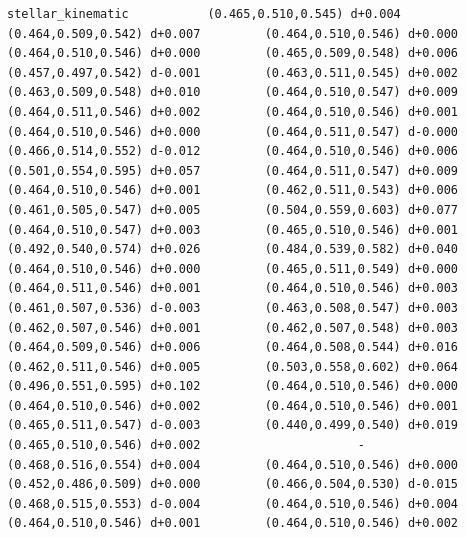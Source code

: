 \documentclass[11pt, letterpaper, openany]{book}
\begin{document}
\begin{empiricalbox}
\begin{lstlisting}[style=terminal]
stellar_kinematic           (0.465,0.510,0.545) d+0.004         (0.464,0.509,0.542) d+0.007         (0.464,0.510,0.546) d+0.000         (0.464,0.510,0.546) d+0.000         (0.465,0.509,0.548) d+0.006         (0.457,0.497,0.542) d-0.001         (0.463,0.511,0.545) d+0.002         (0.463,0.509,0.548) d+0.010         (0.464,0.510,0.547) d+0.009         (0.464,0.511,0.546) d+0.002         (0.464,0.510,0.546) d+0.001         (0.464,0.510,0.546) d+0.000         (0.464,0.511,0.547) d-0.000         (0.466,0.514,0.552) d-0.012         (0.464,0.510,0.546) d+0.006         (0.501,0.554,0.595) d+0.057         (0.464,0.511,0.547) d+0.009         (0.464,0.510,0.546) d+0.001         (0.462,0.511,0.543) d+0.006         (0.461,0.505,0.547) d+0.005         (0.504,0.559,0.603) d+0.077         (0.464,0.510,0.547) d+0.003         (0.465,0.510,0.546) d+0.001         (0.492,0.540,0.574) d+0.026         (0.484,0.539,0.582) d+0.040         (0.464,0.510,0.546) d+0.000         (0.465,0.511,0.549) d+0.000         (0.464,0.511,0.546) d+0.001         (0.464,0.510,0.546) d+0.003         (0.461,0.507,0.536) d-0.003         (0.463,0.508,0.547) d+0.003         (0.462,0.507,0.546) d+0.001         (0.462,0.507,0.548) d+0.003         (0.464,0.509,0.546) d+0.006         (0.464,0.508,0.544) d+0.016         (0.462,0.511,0.546) d+0.005         (0.503,0.558,0.602) d+0.064         (0.496,0.551,0.595) d+0.102         (0.464,0.510,0.546) d+0.000         (0.464,0.510,0.546) d+0.002         (0.464,0.510,0.546) d+0.001         (0.465,0.511,0.547) d-0.003         (0.440,0.499,0.540) d+0.019         (0.465,0.510,0.546) d+0.002                      -                      (0.468,0.516,0.554) d+0.004         (0.464,0.510,0.546) d+0.000         (0.452,0.486,0.509) d+0.000         (0.466,0.504,0.530) d-0.015         (0.468,0.515,0.553) d-0.004         (0.464,0.510,0.546) d+0.004         (0.464,0.510,0.546) d+0.001         (0.464,0.510,0.546) d+0.002     

\end{lstlisting}
\end{empiricalbox}
\end{document}
